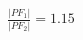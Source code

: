 \documentclass[preview]{standalone}
\begin{document}
\begin{align*}
\frac{|PF_1|}{|PF_2|} = 1.15
\end{align*}
\end{document}
